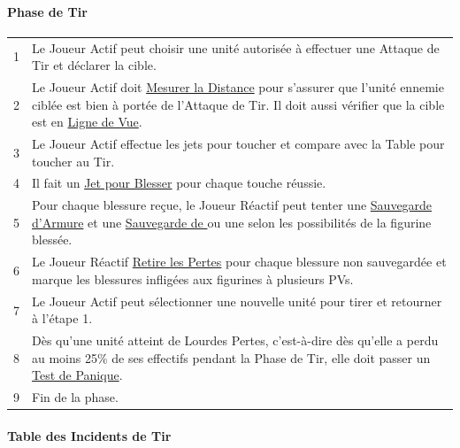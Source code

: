 {\begin{multicols}{2}
\vspace*{\fill}
\end{multicols}

\newpage

\begin{minipage}[t]{.68\linewidth}

\paragraph{Phase de Tir}

\begin{tabular}{c|p{11cm}}
1 & Le Joueur Actif peut choisir une unité autorisée à effectuer une Attaque de Tir et déclarer la cible. \tabularnewline
2 & Le Joueur Actif doit \hyperlink{measuringdistances}{Mesurer la Distance} pour s'assurer que l'unité ennemie ciblée est bien à portée de l'Attaque de Tir. Il doit aussi vérifier que la cible est en \hyperlink{lineofsight}{Ligne de Vue}. \tabularnewline
3 & Le Joueur Actif effectue les jets pour toucher et compare avec la Table pour toucher au Tir. \tabularnewline
4 & Il fait un \hyperlink{towoundroll}{Jet pour Blesser} pour chaque touche réussie. \tabularnewline
5 & Pour chaque blessure reçue, le Joueur Réactif peut tenter une \hyperlink{armoursaveandmodifiers}{Sauvegarde d'Armure} et une \hyperlink{regeneration}{Sauvegarde de \regeneration{}} ou une \hyperlink{wardsave}{\wardsave{}} selon les possibilités de la figurine blessée. \tabularnewline
6 & Le Joueur Réactif \hyperlink{removecasualties}{Retire les Pertes} pour chaque blessure non sauvegardée et marque les blessures infligées aux figurines à plusieurs PVs. \tabularnewline
7 & Le Joueur Actif peut sélectionner une nouvelle unité pour tirer et retourner à l'étape 1. \tabularnewline
8 & Dès qu'une unité atteint de Lourdes Pertes, c'est-à-dire dès qu'elle a perdu au moins 25\% de ses effectifs pendant la Phase de Tir, elle doit passer un \hyperlink{panictest}{Test de Panique}. \tabularnewline
9 & Fin de la phase. \tabularnewline
\end{tabular}

\vspace*{10pt}
\paragraph{Table des Incidents de Tir}


\end{minipage}}
